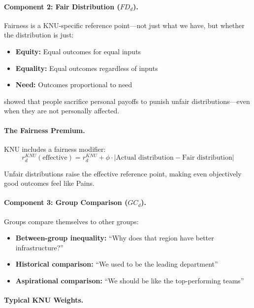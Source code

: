 \paragraph{Component 2: Fair Distribution ($FD_d$).}
Fairness is a KNU-specific reference point---not just what we have, but 
whether the distribution is just:

\begin{itemize}
\item \textbf{Equity:} Equal outcomes for equal inputs
\item \textbf{Equality:} Equal outcomes regardless of inputs
\item \textbf{Need:} Outcomes proportional to need
\end{itemize}

\citet{PAP-fehr1999theory} showed that people sacrifice personal payoffs to 
punish unfair distributions---even when they are not personally affected.

\paragraph{The Fairness Premium.}
KNU includes a fairness modifier:
\begin{equation}
r^{KNU}_d(\text{effective}) = r^{KNU}_d + \phi \cdot |\text{Actual distribution} - \text{Fair distribution}|
\end{equation}

Unfair distributions raise the effective reference point, making even 
objectively good outcomes feel like Pains.

\paragraph{Component 3: Group Comparison ($GC_d$).}
Groups compare themselves to other groups:

\begin{itemize}
\item \textbf{Between-group inequality:} ``Why does that region have better infrastructure?''
\item \textbf{Historical comparison:} ``We used to be the leading department''
\item \textbf{Aspirational comparison:} ``We should be like the top-performing teams''
\end{itemize}

\paragraph{Typical KNU Weights.}

